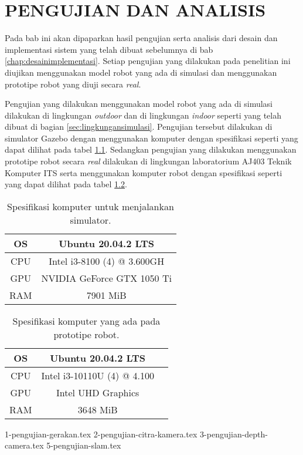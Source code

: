 \chapter{PENGUJIAN DAN ANALISIS}
\label{chap:pengujiananalisis}

Pada bab ini akan dipaparkan hasil pengujian serta analisis dari desain dan implementasi sistem yang telah dibuat sebelumnya di bab \ref{chap:desainimplementasi}.
Setiap pengujian yang dilakukan pada penelitian ini diujikan menggunakan model robot yang ada di simulasi dan menggunakan prototipe robot yang diuji secara \emph{real}.

Pengujian yang dilakukan menggunakan model robot yang ada di simulasi dilakukan di lingkungan \emph{outdoor} dan di lingkungan \emph{indoor} seperti yang telah dibuat di bagian \ref{sec:lingkungansimulasi}.
Pengujian tersebut dilakukan di simulator Gazebo dengan menggunakan komputer dengan spesifikasi seperti yang dapat dilihat pada tabel \ref{tb:spesifikasikomputersimulator}.
Sedangkan pengujian yang dilakukan menggunakan prototipe robot secara \emph{real} dilakukan di lingkungan laboratorium AJ403 Teknik Komputer ITS serta menggunakan komputer robot dengan spesifikasi seperti yang dapat dilihat pada tabel \ref{tb:spesifikasikomputerrobot}.

\begin{longtable}{|c|c|}
  \caption{Spesifikasi komputer untuk menjalankan simulator.}
  \label{tb:spesifikasikomputersimulator}\\
  \hline
  OS  & Ubuntu 20.04.2 LTS \\
  \hline
  CPU & Intel i3-8100 (4) @ 3.600GH \\
  \hline
  GPU & NVIDIA GeForce GTX 1050 Ti \\
  \hline
  RAM & 7901 MiB \\
  \hline
\end{longtable}

\begin{longtable}{|c|c|c|}
  \caption{Spesifikasi komputer yang ada pada prototipe robot.}
  \label{tb:spesifikasikomputerrobot}\\
  \hline
  OS  & Ubuntu 20.04.2 LTS \\
  \hline
  CPU & Intel i3-10110U (4) @ 4.100 \\
  \hline
  GPU & Intel UHD Graphics \\
  \hline
  RAM & 3648 MiB \\
  \hline
\end{longtable}

{1-pengujian-gerakan.tex}
{2-pengujian-citra-kamera.tex}
{3-pengujian-depth-camera.tex}
{5-pengujian-slam.tex}
